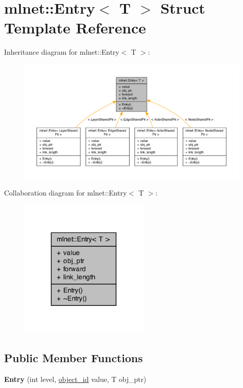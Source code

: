 \hypertarget{structmlnet_1_1_entry}{\section{mlnet\+:\+:Entry$<$ T $>$ Struct Template Reference}
\label{structmlnet_1_1_entry}
}


Inheritance diagram for mlnet\+:\+:Entry$<$ T $>$\+:\nopagebreak
\begin{figure}[H]
\begin{center}
\leavevmode
\includegraphics[width=350pt]{structmlnet_1_1_entry__inherit__graph}
\end{center}
\end{figure}


Collaboration diagram for mlnet\+:\+:Entry$<$ T $>$\+:\nopagebreak
\begin{figure}[H]
\begin{center}
\leavevmode
\includegraphics[width=176pt]{structmlnet_1_1_entry__coll__graph}
\end{center}
\end{figure}
\subsection*{Public Member Functions}
\begin{DoxyCompactItemize}
\item 
\hypertarget{structmlnet_1_1_entry_ab4fe50889ff7f8e222f049bb63f9bc09}{{\bfseries Entry} (int level, \hyperlink{namespacemlnet_a318fc9bfdb74e1da4d44d0c50d4a453d}{object\+\_\+id} value, T obj\+\_\+ptr)}\label{structmlnet_1_1_entry_ab4fe50889ff7f8e222f049bb63f9bc09}

\end{DoxyCompactItemize}
